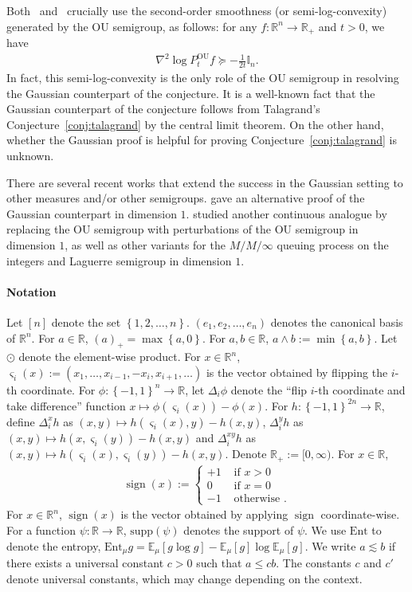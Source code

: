 \documentclass[11pt]{article}
\newcommand{\supp}{\text{supp}}
\newcommand{\flip}{\varsigma}
\theoremstyle{named}
\theoremstyle{plain}
\newcommand{\defn}{:=}
\DeclareMathOperator{\sign}{sign}
\newcommand{\real}{\ensuremath{\mathbb{R}}}
\newcommand{\Ind}{\ensuremath{\mathbb{I}}}
\newcommand{\Exs}{\ensuremath{{\mathbb{E}}}}
\newcommand{\Ent}{\text{Ent}}
\newcommand{\braces}[1]{\left\{ #1 \right \}}
\begin{document}
Both~\cite{eldan2018regularization} and~\cite{lehec2016regularization} crucially use the second-order smoothness (or semi-log-convexity) generated by the OU semigroup, as follows: for any $f:\real^n \to \real_+$ and $t > 0$, we have
\begin{align*}
  \nabla^2 \log P_t^{\text{OU}} f \succeq -\frac{1}{2t} \Ind_n.
\end{align*}
In fact, this semi-log-convexity is the only role of the OU semigroup in resolving the Gaussian counterpart of the conjecture. It is a well-known fact that the Gaussian counterpart of the conjecture follows from Talagrand's Conjecture~\ref{conj:talagrand} by the central limit theorem. On the other hand, whether the Gaussian proof is helpful for proving Conjecture~\ref{conj:talagrand} is unknown.

There are several recent works that extend the success in the Gaussian setting to other measures and/or other semigroups. \cite{gozlan2019deviation} gave an alternative proof of the Gaussian counterpart in dimension $1$.  \cite{gozlan2023log} studied another continuous analogue by replacing the OU semigroup with perturbations of the OU semigroup in dimension $1$, as well as other variants for the $M/M/\infty$ queuing process on the integers and Laguerre semigroup in dimension $1$. 


\paragraph{Notation} Let $[n]$ denote the set $\braces{1, 2, \ldots, n}$. $(e_1, e_2, \ldots, e_n)$ denotes the canonical basis of $\real^n$. For $a \in \real$, $(a)_+ = \max\braces{a, 0}$. For $a, b \in \real$, $a \wedge b \defn \min\braces{a, b}$. Let $\odot$ denote the element-wise product. For $x \in \real^n$, $\flip_i(x) \defn (x_1, \ldots, x_{i-1}, -x_i, x_{i+1}, \ldots )$ is the vector obtained by flipping the $i$-th coordinate. For $\phi: \braces{-1,1}^n \to \real$, let $\Delta_i \phi$ denote the ``flip $i$-th coordinate and take difference'' function $x\mapsto \phi(\flip_i(x)) - \phi(x)$. For $h: \braces{-1,1}^{2n} \to \real$, define $\Delta_i^x h$ as $(x, y) \mapsto h(\flip_i(x), y) - h(x, y)$, $\Delta_i^y h$ as $(x, y) \mapsto h(x, \flip_i(y)) - h(x, y)$ and $\Delta_i^{xy} h$ as $(x, y) \mapsto h(\flip_i(x), \flip_i(y)) - h(x, y)$. Denote $\real_+ \defn [0,\infty)$.  For $x\in \real$, 
\begin{align*}
  \sign(x) \defn \begin{cases}
    +1 & \text{ if } x > 0\\
    0 & \text{ if } x = 0\\
    -1 & \text{ otherwise }.
  \end{cases}
\end{align*}
For $x \in \real^n$, $\sign(x)$ is the vector obtained by applying $\sign$ coordinate-wise. For a function $\psi: \real \to \real$, $\supp(\psi)$ denotes the support of $\psi$. We use $\Ent$ to denote the entropy, $\Ent_\mu g = \Exs_\mu[g \log g] - \Exs_\mu[g] \log \Exs_\mu [g]$. We write $a \lesssim b$ if there exists a universal constant $c > 0$ such that $a \leq c b$. The constants $c$ and $c'$ denote universal constants, which may change depending on the context.
\end{document}

